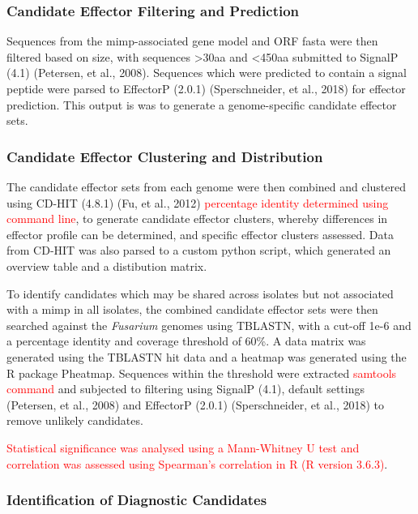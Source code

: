 \subsubsection{Candidate Effector Filtering and Prediction}

Sequences from the \ac{mimp}-associated gene model and ORF fasta were then filtered based on size, with sequences >30aa and <450aa submitted to SignalP (4.1) (Petersen, et al., 2008). Sequences which were  predicted to contain a signal peptide were parsed to EffectorP (2.0.1) (Sperschneider, et al., 2018) for effector prediction. This output is was to generate a genome-specific candidate effector sets.

\subsubsection{Candidate Effector Clustering and Distribution}

The candidate effector sets from each genome were then combined and clustered using CD-HIT (4.8.1) (Fu, et al., 2012) \textcolor{red}{percentage identity determined using command line}, to generate candidate effector clusters, whereby differences in effector profile can be determined, and specific effector clusters assessed. Data from CD-HIT was also parsed to a custom python script, which generated an overview table and a distibution matrix.

To identify candidates which may be shared across isolates but not associated with a \ac{mimp} in all isolates, the combined candidate effector sets were then searched against the \textit{Fusarium} genomes using TBLASTN, with a cut-off 1e-6 and a percentage identity and coverage threshold of 60\%. A data matrix was generated using the TBLASTN hit data and a heatmap was generated using the R package Pheatmap. Sequences within the threshold were extracted \textcolor{red}{samtools command} and subjected to filtering using SignalP (4.1), default settings (Petersen, et al., 2008) and EffectorP (2.0.1) (Sperschneider, et al., 2018) to remove unlikely candidates. 

\textcolor{red}{Statistical significance was analysed using a Mann-Whitney U test and correlation was assessed using Spearman’s correlation in R (R version 3.6.3)}.

\subsubsection{Identification of Diagnostic Candidates}

